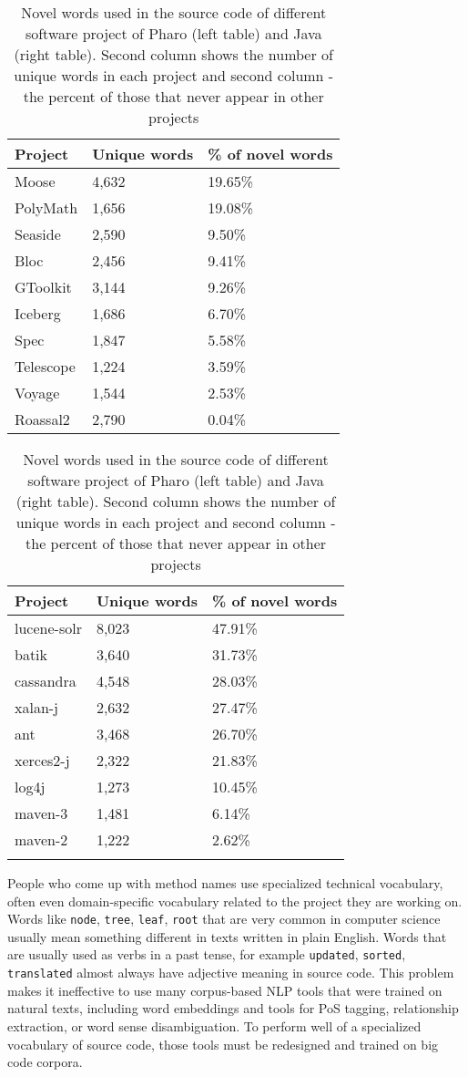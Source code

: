 \begin{table}[H]
\begin{tabular}{|l|p{1.5cm}|p{2cm}|}
\hline
\textbf{Project} & \textbf{Unique words} & \textbf{\% of novel words} \\
\hline
Moose     & 4,632   & 19.65\% \\
PolyMath  & 1,656   & 19.08\% \\
Seaside   & 2,590   & 9.50\% \\
Bloc      & 2,456   & 9.41\% \\
GToolkit  & 3,144   & 9.26\% \\
Iceberg   & 1,686   & 6.70\% \\
Spec      & 1,847   & 5.58\% \\
Telescope & 1,224   & 3.59\% \\
Voyage    & 1,544   & 2.53\% \\
Roassal2  & 2,790   & 0.04\% \\
\hline
\end{tabular}
\quad\quad
\begin{tabular}{|l|p{1.5cm}|p{2cm}|}
\hline
\textbf{Project} & \textbf{Unique words} & \textbf{\% of novel words} \\
\hline
lucene-solr & 8,023   & 47.91\% \\
batik       & 3,640   & 31.73\% \\
cassandra   & 4,548   & 28.03\% \\
xalan-j     & 2,632   & 27.47\% \\
ant         & 3,468   & 26.70\% \\
xerces2-j   & 2,322   & 21.83\% \\
log4j       & 1,273   & 10.45\% \\
maven-3     & 1,481   & 6.14\% \\
maven-2     & 1,222   & 2.62\% \\
& & \\
\hline
\end{tabular}
\caption{Novel words used in the source code of different software project of Pharo (left table) and Java (right table). Second column shows the number of unique words in each project and second column - the percent of those that never appear in other projects}
\label{tab:Naturalness-Novelties}
\end{table}

People who come up with method names use specialized technical vocabulary, often even domain-specific vocabulary related to the project they are working on. Words like \texttt{node}, \texttt{tree}, \texttt{leaf}, \texttt{root} that are very common in computer science usually mean something different in texts written in plain English. Words that are usually used as verbs in a past tense, for example \texttt{updated}, \texttt{sorted}, \texttt{translated} almost always have adjective meaning in source code. This problem makes it ineffective to use many corpus-based NLP tools that were trained on natural texts, including word embeddings and tools for PoS tagging, relationship extraction, or word sense disambiguation. To perform well of a specialized vocabulary of source code, those tools must be redesigned and trained on big code corpora.

